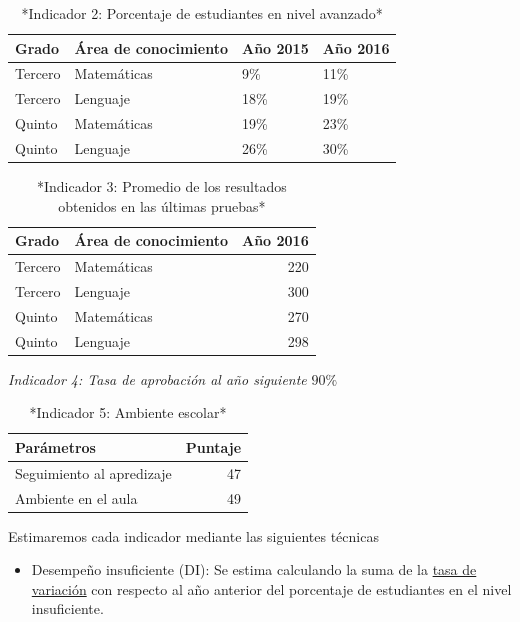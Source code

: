 \documentclass[
]{book}
\providecommand{\tightlist}{%
  \setlength{\itemsep}{0pt}\setlength{\parskip}{0pt}}
\begin{document}
\begin{table}

\caption{\label{tab:unnamed-chunk-10}*Indicador 2: Porcentaje de estudiantes en nivel avanzado*}
\centering
\begin{tabular}[t]{l|l|l|l}
\hline
Grado & Área de conocimiento & Año 2015 & Año 2016\\
\hline
Tercero & Matemáticas & 9\% & 11\%\\
\hline
Tercero & Lenguaje & 18\% & 19\%\\
\hline
Quinto & Matemáticas & 19\% & 23\%\\
\hline
Quinto & Lenguaje & 26\% & 30\%\\
\hline
\end{tabular}
\end{table}

\begin{table}

\caption{\label{tab:unnamed-chunk-11}*Indicador 3: Promedio de los resultados obtenidos en las últimas pruebas*}
\centering
\begin{tabular}[t]{l|l|r}
\hline
Grado & Área de conocimiento & Año 2016\\
\hline
Tercero & Matemáticas & 220\\
\hline
Tercero & Lenguaje & 300\\
\hline
Quinto & Matemáticas & 270\\
\hline
Quinto & Lenguaje & 298\\
\hline
\end{tabular}
\end{table}

\emph{Indicador 4: Tasa de aprobación al año siguiente } \(90\%\)

\begin{table}

\caption{\label{tab:unnamed-chunk-12}*Indicador 5: Ambiente escolar*}
\centering
\begin{tabular}[t]{l|r}
\hline
Parámetros & Puntaje\\
\hline
Seguimiento al apredizaje & 47\\
\hline
Ambiente en el aula & 49\\
\hline
\end{tabular}
\end{table}

Estimaremos cada indicador mediante las siguientes técnicas

\begin{itemize}
\tightlist
\item
  Desempeño insuficiente (DI): Se estima calculando la suma de la \protect\hyperlink{tasavariaciuxf3n}{tasa de variación} con respecto al año anterior del porcentaje de estudiantes en el nivel insuficiente.
\end{itemize}
\end{document}
